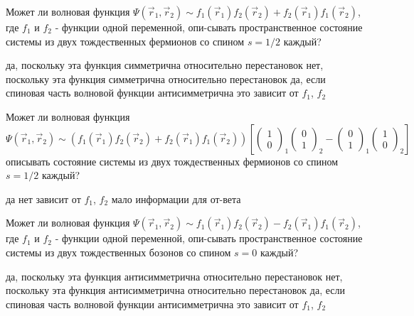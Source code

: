 \documentclass[11pt,a4paper]{exam}
\begin{document}
\begin{questions}
\question Может ли волновая функция $\Psi ({\vec r_1},{\vec r_2}) \sim {f_1}({\vec r_1}){f_2}({\vec r_2}) + {f_2}({\vec r_1}){f_1}({\vec r_2})$, где ${f_1}$ и ${f_2}$ - функции одной переменной, опи-сывать пространственное состояние системы из двух тождественных фермионов со спином $s = 1/2$ каждый?
\begin{choices}
\choice да, поскольку эта функция симметрична относительно перестановок
\choice нет, поскольку эта функция симметрична относительно перестановок
\choice да, если спиновая часть волновой функции антисимметрична
\choice это зависит от ${f_1}$, ${f_2}$
\end{choices}

\question Может ли волновая функция $\Psi ({\vec r_1},{\vec r_2}) \sim \left( {{f_1}({{\vec r}_1}){f_2}({{\vec r}_2}) + {f_2}({{\vec r}_1}){f_1}({{\vec r}_2})} \right)\left[ {{{\left( {\begin{array}{*{20}{c}}
1\\
0
\end{array}} \right)}_1}{{\left( {\begin{array}{*{20}{c}}
0\\
1
\end{array}} \right)}_2} - {{\left( {\begin{array}{*{20}{c}}
0\\
1
\end{array}} \right)}_1}{{\left( {\begin{array}{*{20}{c}}
1\\
0
\end{array}} \right)}_2}} \right]$ описывать состояние системы из двух тождественных фермионов со спином $s = 1/2$ каждый?
\begin{choices}
\choice да    
\choice нет      
\choice зависит от ${f_1}$, ${f_2}$      
\choice мало информации для от-вета
\end{choices}

\question Может ли волновая функция $\Psi ({\vec r_1},{\vec r_2}) \sim {f_1}({\vec r_1}){f_2}({\vec r_2}) - {f_2}({\vec r_1}){f_1}({\vec r_2})$, где ${f_1}$ и ${f_2}$ - функции одной переменной, опи-сывать пространственное состояние системы из двух тождественных бозонов со спином $s = 0$ каждый?
\begin{choices}
\choice да, поскольку эта функция антисимметрична относительно перестановок
\choice нет, поскольку эта функция антисимметрична относительно перестановок
\choice да, если спиновая часть волновой функции антисимметрична
\choice это зависит от ${f_1}$, ${f_2}$
\end{choices}


\end{questions}
\end{document}
